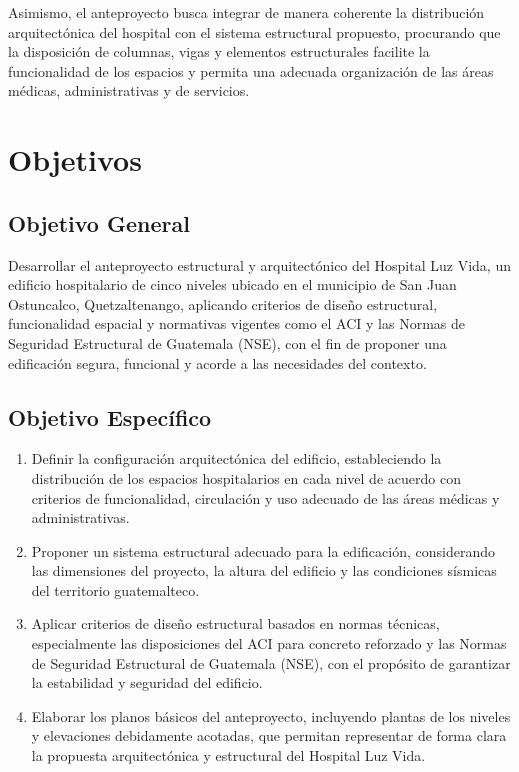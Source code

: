 \documentclass[14pt,letterpaper]{extarticle}
\begin{document}
	Asimismo, el anteproyecto busca integrar de manera coherente la distribución arquitectónica del hospital con el sistema estructural propuesto, procurando que la disposición de columnas, vigas y elementos estructurales facilite la funcionalidad de los espacios y permita una adecuada organización de las áreas médicas, administrativas y de servicios. 
	

	
	\section*{Objetivos}
		
	\subsection*{Objetivo General}
	Desarrollar el anteproyecto estructural y arquitectónico del Hospital Luz Vida, un edificio hospitalario de cinco niveles ubicado en el municipio de San Juan Ostuncalco, Quetzaltenango, aplicando criterios de diseño estructural, funcionalidad espacial y normativas vigentes como el ACI y las Normas de Seguridad Estructural de Guatemala (NSE), con el fin de proponer una edificación segura, funcional y acorde a las necesidades del contexto.
	
	\subsection*{Objetivo Específico}
	\begin{enumerate}
		\item Definir la configuración arquitectónica del edificio, estableciendo la distribución de los espacios hospitalarios en cada nivel de acuerdo con criterios de funcionalidad, circulación y uso adecuado de las áreas médicas y administrativas.
		\item Proponer un sistema estructural adecuado para la edificación, considerando las dimensiones del proyecto, la altura del edificio y las condiciones sísmicas del territorio guatemalteco.
		\item Aplicar criterios de diseño estructural basados en normas técnicas, especialmente las disposiciones del ACI para concreto reforzado y las Normas de Seguridad Estructural de Guatemala (NSE), con el propósito de garantizar la estabilidad y seguridad del edificio.
		\item Elaborar los planos básicos del anteproyecto, incluyendo plantas de los niveles y elevaciones debidamente acotadas, que permitan representar de forma clara la propuesta arquitectónica y estructural del Hospital Luz Vida.
	\end{enumerate}
	
\end{document}
